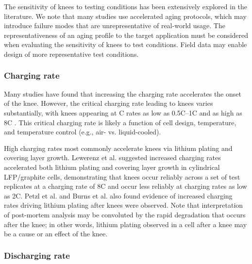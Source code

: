 \documentclass[journal=jpclcd,manuscript=article]{achemso}
\begin{document}
The sensitivity of knees to testing conditions has been extensively explored in the literature.
We note that many studies use accelerated aging protocols, which may introduce failure modes that are unrepresentative of real-world usage.
The representativeness of an aging profile to the target application must be considered when evaluating the sensitivity of knees to test conditions.
Field data may enable design of more representative test conditions.\cite{sulzer_challenge_2021}

\subsubsection{Charging rate}
Many studies have found that increasing the charging rate accelerates the onset of the knee.\cite{lewerenz_systematic_2017,lewerenz_post-mortem_2017, petzl_lithium_2015, burns_-situ_2015, waldmann_optimization_2015, schuster_nonlinear_2015, severson_data-driven_2019, schindler_fast_2018, keil_linear_2019} However, the critical charging rate leading to knees varies substantially, with knees appearing at C rates as low as 0.5C--1C \cite{waldmann_optimization_2015, willenberg_development_2020} and as high as 8C \cite{lewerenz_systematic_2017}. This critical charging rate is likely a function of cell design, temperature, and temperature control (e.g., air- vs. liquid-cooled).

High charging rates most commonly accelerate knees via lithium plating and covering layer growth. Lewerenz et al.\cite{lewerenz_systematic_2017,lewerenz_post-mortem_2017} suggested increased charging rates accelerated both lithium plating and covering layer growth in cylindrical LFP/graphite cells, demonstrating that knees occur reliably across a set of test replicates at a charging rate of 8C and occur less reliably at charging rates as low as 2C. Petzl et al.\cite{petzl_lithium_2015} and Burns et al.\cite{burns_-situ_2015} also found evidence of increased charging rates driving lithium plating after knees were observed. Note that interpretation of post-mortem analysis may be convoluted by the rapid degradation that occurs after the knee; in other words, lithium plating observed in a cell after a knee may be a cause or an effect of the knee.

\subsubsection{Discharging rate}
\end{document}

